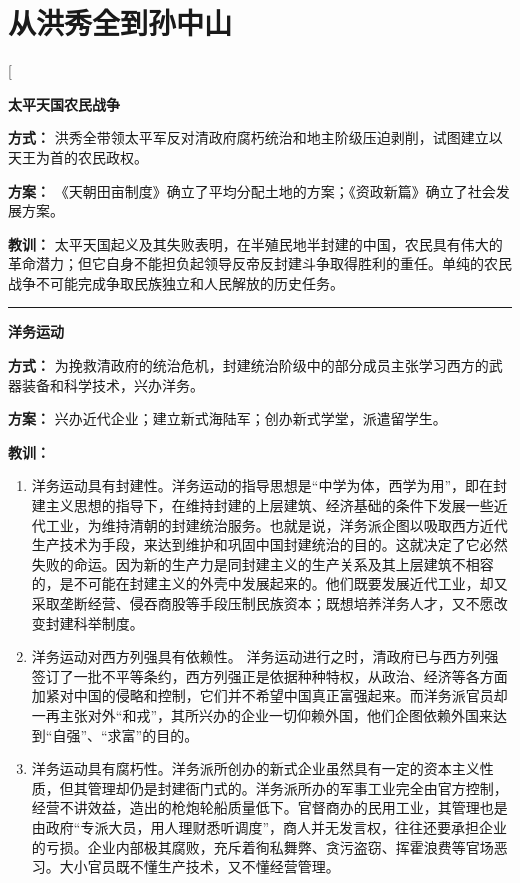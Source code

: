 
\section{从洪秀全到孙中山}
\begin{enumerate}
	\ans[
		{\begin{center}\textbf{太平天国农民战争}\end{center}}
		\textbf{方式：} 洪秀全带领太平军反对清政府腐朽统治和地主阶级压迫剥削，试图建立以天王为首的农民政权。\par
		\textbf{方案：} 《天朝田亩制度》确立了平均分配土地的方案；《资政新篇》确立了社会发展方案。\par
		\textbf{教训：} 太平天国起义及其失败表明，在半殖民地半封建的中国，农民具有伟大的革命潜力；但它自身不能担负起领导反帝反封建斗争取得胜利的重任。单纯的农民战争不可能完成争取民族独立和人民解放的历史任务。\par
		\bigskip
		\hrule
		\bigskip
		{\begin{center}\textbf{洋务运动}\end{center}}\par
			\textbf{方式：} 为挽救清政府的统治危机，封建统治阶级中的部分成员主张学习西方的武器装备和科学技术，兴办洋务。\par
			\textbf{方案：}  兴办近代企业；建立新式海陆军；创办新式学堂，派遣留学生。\par
			\textbf{教训：} \begin{enumerate}
				\item 洋务运动具有封建性。洋务运动的指导思想是“中学为体，西学为用”，即在封建主义思想的指导下，在维持封建的上层建筑、经济基础的条件下发展一些近代工业，为维持清朝的封建统治服务。也就是说，洋务派企图以吸取西方近代生产技术为手段，来达到维护和巩固中国封建统治的目的。这就决定了它必然失败的命运。因为新的生产力是同封建主义的生产关系及其上层建筑不相容的，是不可能在封建主义的外壳中发展起来的。他们既要发展近代工业，却又采取垄断经营、侵吞商股等手段压制民族资本；既想培养洋务人才，又不愿改变封建科举制度。
				\item 洋务运动对西方列强具有依赖性。 洋务运动进行之时，清政府已与西方列强签订了一批不平等条约，西方列强正是依据种种特权，从政治、经济等各方面加紧对中国的侵略和控制，它们并不希望中国真正富强起来。而洋务派官员却一再主张对外“和戎”，其所兴办的企业一切仰赖外国，他们企图依赖外国来达到“自强”、“求富”的目的。
				\item 洋务运动具有腐朽性。洋务派所创办的新式企业虽然具有一定的资本主义性质，但其管理却仍是封建衙门式的。洋务派所办的军事工业完全由官方控制，经营不讲效益，造出的枪炮轮船质量低下。官督商办的民用工业，其管理也是由政府“专派大员，用人理财悉听调度”，商人并无发言权，往往还要承担企业的亏损。企业内部极其腐败，充斥着徇私舞弊、贪污盗窃、挥霍浪费等官场恶习。大小官员既不懂生产技术，又不懂经营管理。\end{enumerate}\par

\end{enumerate}
